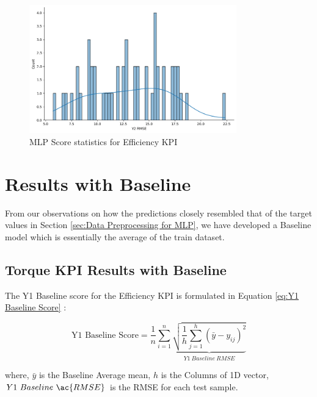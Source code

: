 \documentclass{report} %
\begin{document}
\begin{figure}[H]
    \centering
    \includegraphics[width=0.8\textwidth]{./ReportImages/score_MLP_y2.png } 
    \caption{MLP Score statistics for Efficiency \ac{KPI}} 
    \label{fig:MLP Score statistics for 3D KPI(Efficiency)}
\end{figure}

\section{Results with Baseline}\label{sec:Results with Baseline}

From our observations on how the predictions closely resembled that of the target values in Section \ref{sec:Data Preprocessing for MLP}, we have developed a Baseline model which is essentially the average of the train dataset.

\subsection{Torque \ac{KPI} Results with Baseline}\label{sec:3D Efficiency Grid Results with Baseline}

The Y1 Baseline score for the Efficiency \ac{KPI} is formulated in Equation \ref{eq:Y1 Baseline Score} :

\begin{equation}
    \text{Y1 Baseline Score} = \frac{1}{n} \sum_{i=1}^{n} \underbrace{ \sqrt{\frac{1}{h} \sum_{j=1}^{h} (\bar{y} - y_{ij})^2}}_{Y1\ Baseline\ RMSE}
    \label{eq:Y1 Baseline Score}
\end{equation}
    
where, \(\bar{y}\) is the Baseline Average mean, \(h\) is the Columns of 1D vector, \(Y1\ Baseline\ \ac{RMSE}\) is the \ac{RMSE} for each test sample.
    

\vspace{1em} %
\end{document}
